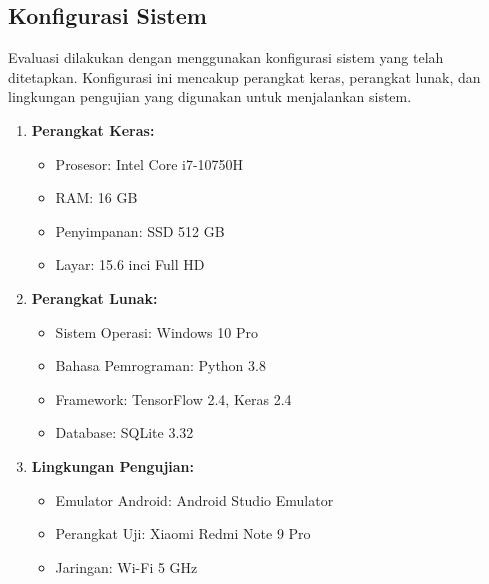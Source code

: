\subsection{Konfigurasi Sistem}
\label{subsec:konfigurasi-sistem}

Evaluasi dilakukan dengan menggunakan konfigurasi sistem yang telah ditetapkan. Konfigurasi ini mencakup perangkat keras, perangkat lunak, dan lingkungan pengujian yang digunakan untuk menjalankan sistem. 

\subsu

\begin{enumerate}
    \item{
        \textbf{Perangkat Keras:}
        \begin{itemize}
            \item Prosesor: Intel Core i7-10750H
            \item RAM: 16 GB
            \item Penyimpanan: SSD 512 GB
            \item Layar: 15.6 inci Full HD
        \end{itemize}
    }
    \item{
        \textbf{Perangkat Lunak:}
        \begin{itemize}
            \item Sistem Operasi: Windows 10 Pro
            \item Bahasa Pemrograman: Python 3.8
            \item Framework: TensorFlow 2.4, Keras 2.4
            \item Database: SQLite 3.32
        \end{itemize}
    }
    \item{
        \textbf{Lingkungan Pengujian:}
        \begin{itemize}
            \item Emulator Android: Android Studio Emulator
            \item Perangkat Uji: Xiaomi Redmi Note 9 Pro
            \item Jaringan: Wi-Fi 5 GHz
        \end{itemize}
    }
\end{enumerate}
